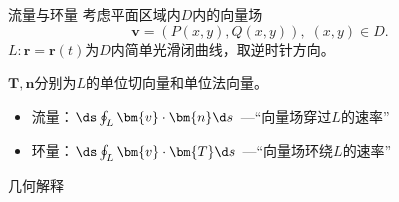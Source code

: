 \begin{frame}{流量与环量}
	\linespread{1.2}
	考虑平面区域内$D$内的向量场
	$$\bm{v}=(P(x,y),Q(x,y)),\;(x,y)\in D.$$
	\pause $L:\bm{r}=\bm{r}(t)$为$D$内简单光滑闭曲线，\pause 取逆时针方向。\pause 
	
	$\bm{T},\bm{n}$分别为$L$的单位切向量和单位法向量。\pause 
	\begin{itemize}
	  \item {\bb 流量：}\pause $\ds\oint_L\bm{v}\cdot\bm{n}\d s$\pause
	  \alert{\;—“向量场穿过$L$的速率”}\pause 
	  \item {\bb 环量：}\pause $\ds\oint_L\bm{v}\cdot\bm{T}\d s$\pause
	  \alert{\;—“向量场环绕$L$的速率”}
	\end{itemize}
\end{frame}

\begin{frame}{几何解释}
	\linespread{1.2}
	\begin{columns}\pause 
			\begin{center}
				\pause 
				

\end{center}
\end{columns}
\end{frame}
